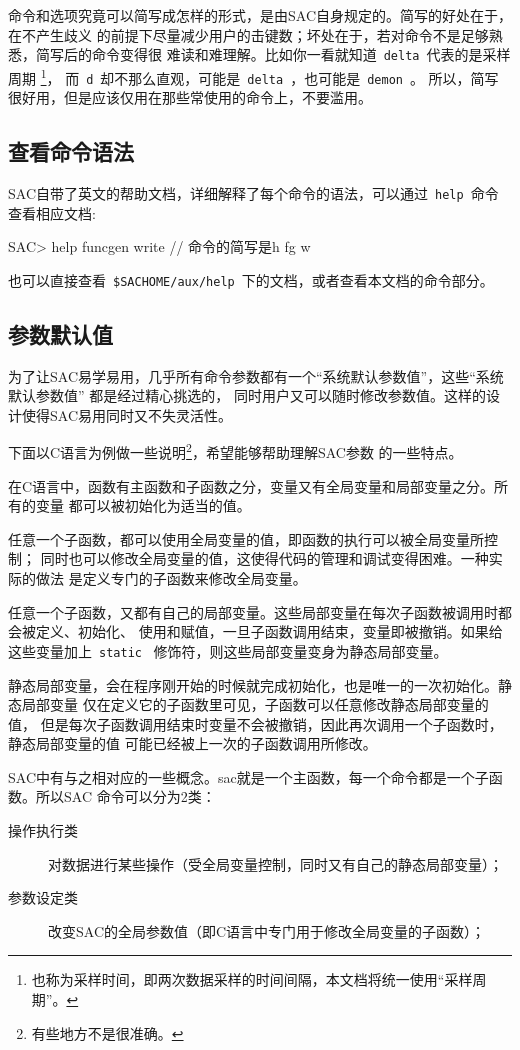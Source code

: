 命令和选项究竟可以简写成怎样的形式，是由SAC自身规定的。简写的好处在于，在不产生歧义
的前提下尽量减少用户的击键数；坏处在于，若对命令不是足够熟悉，简写后的命令变得很
难读和难理解。比如你一看就知道~\verb+delta+~代表的是采样周期
\footnote{也称为采样时间，即两次数据采样的时间间隔，本文档将统一使用``采样周期''。}，
而~\verb+d+~却不那么直观，可能是~\verb+delta+~，也可能是~\verb+demon+~。
所以，简写很好用，但是应该仅用在那些常使用的命令上，不要滥用。

\subsection{查看命令语法}
SAC自带了英文的帮助文档，详细解释了每个命令的语法，可以通过~\verb+help+~命令
查看相应文档:
\begin{SACCode}
SAC> help funcgen write   // 命令的简写是h fg w
\end{SACCode}
也可以直接查看~\verb+$SACHOME/aux/help+~下的文档，或者查看本文档的命令部分。

\subsection{参数默认值}
为了让SAC易学易用，几乎所有命令参数都有一个``系统默认参数值''，这些``系统默认参数值''
都是经过精心挑选的，
同时用户又可以随时修改参数值。这样的设计使得SAC易用同时又不失灵活性。

下面以C语言为例做一些说明\footnote{有些地方不是很准确。}，希望能够帮助理解SAC参数
的一些特点。

在C语言中，函数有主函数和子函数之分，变量又有全局变量和局部变量之分。所有的变量
都可以被初始化为适当的值。

任意一个子函数，都可以使用全局变量的值，即函数的执行可以被全局变量所控制；
同时也可以修改全局变量的值，这使得代码的管理和调试变得困难。一种实际的做法
是定义专门的子函数来修改全局变量。

任意一个子函数，又都有自己的局部变量。这些局部变量在每次子函数被调用时都会被定义、初始化、
使用和赋值，一旦子函数调用结束，变量即被撤销。如果给这些变量加上~\verb+static+~
修饰符，则这些局部变量变身为静态局部变量。

静态局部变量，会在程序刚开始的时候就完成初始化，也是唯一的一次初始化。静态局部变量
仅在定义它的子函数里可见，子函数可以任意修改静态局部变量的值，
但是每次子函数调用结束时变量不会被撤销，因此再次调用一个子函数时，静态局部变量的值
可能已经被上一次的子函数调用所修改。

SAC中有与之相对应的一些概念。sac就是一个主函数，每一个命令都是一个子函数。所以SAC
命令可以分为2类：
\begin{description}
\item[操作执行类] 对数据进行某些操作（受全局变量控制，同时又有自己的静态局部变量）；
\item[参数设定类] 改变SAC的全局参数值（即C语言中专门用于修改全局变量的子函数）； 
\end{description}

